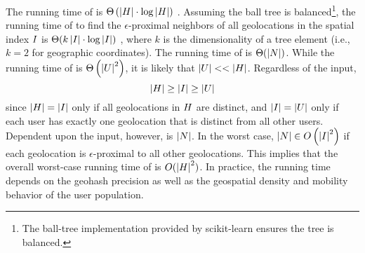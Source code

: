 The running time of  is $\Theta\left(\left\vert H \right\vert \cdot \log\left\vert H \right\vert\right)$ \citep{Omohundro1989}. Assuming the ball tree is balanced\footnote{The ball-tree implementation provided by scikit-learn \citep{sklearn2013} ensures the tree is balanced.}, the running time of  to find the $\epsilon$-proximal neighbors of all geolocations in the spatial index $I$ is $\Theta(k \left\vert I \right\vert \cdot \log\left\vert I \right\vert)$ , where $k$ is the dimensionality of a tree element (i.e., $k = 2$ for geographic coordinates). The running time of  is $\Theta(\left\vert N \right\vert)$. While the running time of  is $\Theta\left(\left\vert U \right\vert^2\right)$, it is likely that $\left\vert U \right\vert << \left\vert H \right\vert$. Regardless of the input,
\begin{equation*}
  \left\vert H \right\vert \geq \left\vert I \right\vert \geq \left\vert U \right\vert
\end{equation*}
since $\left\vert H \right\vert = \left\vert I \right\vert$ only if all geolocations in $H$ are distinct, and $\left\vert I \right\vert = \left\vert U \right\vert$ only if each user has exactly one geolocation that is distinct from all other users. Dependent upon the input, however, is $\left\vert N \right\vert$. In the worst case, $\left\vert N \right\vert \in O\left(\left\vert I \right\vert^2\right)$ if each geolocation is $\epsilon$-proximal to all other geolocations. This implies that the overall worst-case running time of  is $O(\left\vert H \right\vert^2)$. In practice, the running time depends on the geohash precision as well as the geospatial density and mobility behavior of the user population.